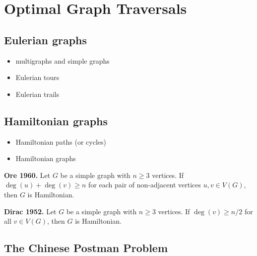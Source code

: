 
\chapter{Optimal Graph Traversals}
\label{chap:optimal_traversals}



\section{Eulerian graphs}

\begin{itemize}
\item multigraphs and simple graphs

\item Eulerian tours

\item Eulerian trails
\end{itemize}



\section{Hamiltonian graphs}

\begin{itemize}
\item Hamiltonian paths (or cycles)

\item Hamiltonian graphs
\end{itemize}

\begin{theorem}
\textbf{Ore 1960.}
Let $G$ be a simple graph with $n \geq 3$ vertices. If
$\deg(u) + \deg(v) \geq n$ for each pair of non-adjacent vertices
$u, v \in V(G)$, then $G$ is Hamiltonian.
\end{theorem}

\begin{corollary}
\textbf{Dirac 1952.}
Let $G$ be a simple graph with $n \geq 3$ vertices. If
$\deg(v) \geq n / 2$ for all $v \in V(G)$, then $G$ is Hamiltonian.
\end{corollary}



\section{The Chinese Postman Problem}

